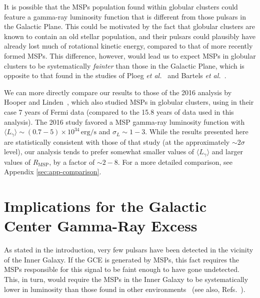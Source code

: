 \documentclass[a4paper,11pt]{article}
\begin{document}
It is possible that the MSPs population found within globular clusters could feature a gamma-ray luminosity function that is different from those pulsars in the Galactic Plane. This could be motivated by the fact that globular clusters are known to contain an old stellar population, and their pulsars could plausibly have already lost much of rotational kinetic energy, compared to that of more recently formed MSPs. This difference, however, would lead us to expect MSPs in globular clusters to be systematically \textit{fainter} than those in the Galactic Plane, which is opposite to that found in the studies of Ploeg \textit{et al.}~\cite{Ploeg:2017vai} and Bartels \textit{et al.}~\cite{Bartels:2018xom}.   

We can more directly compare our results to those of the 2016 analysis by Hooper and Linden~\cite{Hooper:2016rap}, which also studied MSPs in globular clusters, using in their case 7 years of Fermi data (compared to the 15.8 years of data used in this analysis). The 2016 study favored a MSP gamma-ray luminosity function with $\langle L_{\gamma} \rangle \sim (0.7-5) \times 10^{34} \, \textrm{erg/s}$ and $\sigma_L \sim 1-3$. While the results presented here are statistically consistent with those of that study (at the approximately $\sim 2\sigma$ level), our analysis tends to prefer somewhat smaller values of $\langle L_{\gamma} \rangle$ and larger values of $R_\textrm{MSP}$, by a factor of $\sim 2-8$. For a more detailed comparison, see Appendix \ref{sec:app-comparison}.





\section{Implications for the Galactic Center Gamma-Ray Excess}


As stated in the introduction, very few pulsars have been detected in the vicinity of the Inner Galaxy. If the GCE is generated by MSPs, this fact requires the MSPs responsible for this signal to be faint enough to have gone undetected. This, in turn, would require the MSPs in the Inner Galaxy to be systematically lower in luminosity than those found in other environments~\cite{Holst:2024fvb} (see also, Refs.~\cite{Cholis:2014noa,Hooper:2016rap,Hooper:2015jlu,Bartels:2018xom,Ploeg:2017vai,Ploeg:2020jeh,Dinsmore:2021nip}).
\end{document}
